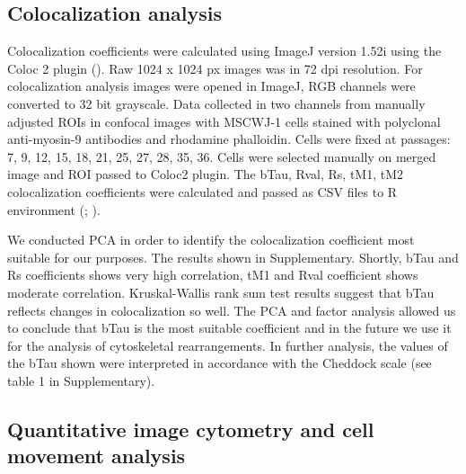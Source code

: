 \documentclass[alpha-refs]{wiley-article}
\begin{document}
\subsection{Colocalization analysis}

Colocalization coefficients were calculated using ImageJ version 1.52i using the Coloc 2 plugin (\cite{rueden2017imagej2}).
Raw 1024 x 1024 px images was in 72 dpi resolution.
For colocalization analysis images were opened in ImageJ, RGB channels were converted to 32 bit grayscale.
Data collected in two channels from manually adjusted ROIs in confocal images with MSCWJ-1 cells stained with polyclonal anti-myosin-9 antibodies and rhodamine phalloidin. Cells were fixed at passages: 7, 9, 12, 15, 18, 21, 25, 27, 28, 35, 36.
Cells were selected manually on merged image and ROI passed to Coloc2 plugin.
The bTau, Rval, Rs, tM1, tM2 colocalization coefficients were calculated and passed as CSV files to R environment (\cite{adler2008replicate}; \cite{bergholm2010analysis}).

We conducted PCA in order to identify the colocalization coefficient most suitable for our purposes.
The results shown in Supplementary.
Shortly, bTau and Rs coefficients shows very high correlation, tM1 and Rval coefficient shows moderate correlation.
Kruskal-Wallis rank sum test results suggest that bTau reflects changes in colocalization so well.
The PCA and factor analysis allowed us to conclude that bTau is the most suitable coefficient and in the future we use it for the analysis of cytoskeletal rearrangements.
In further analysis, the values of the bTau shown were interpreted in accordance with the Cheddock scale (see table 1 in Supplementary).

\subsection{Quantitative image cytometry and cell movement analysis}
\end{document}
